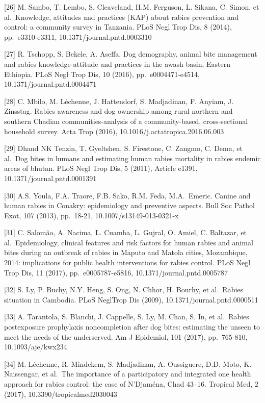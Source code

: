 \documentclass[
]{book}
\begin{document}
{[}26{]} M. Sambo, T. Lembo, S. Cleaveland, H.M. Ferguson, L. Sikana, C. Simon, et al.~Knowledge, attitudes and practices (KAP) about rabies prevention and control: a community survey in Tanzania. PLoS Negl Trop Dis, 8 (2014), pp.~e3310-e3311, 10.1371/journal.pntd.0003310

{[}27{]} R. Tschopp, S. Bekele, A. Aseffa. Dog demography, animal bite management and rabies knowledge-attitude and practices in the awash basin, Eastern Ethiopia. PLoS Negl Trop Dis, 10 (2016), pp.~e0004471-e4514, 10.1371/journal.pntd.0004471

{[}28{]} C. Mbilo, M. Léchenne, J. Hattendorf, S. Madjadinan, F. Anyiam, J. Zinsstag. Rabies awareness and dog ownership among rural northern and southern Chadian communities-analysis of a community-based, cross-sectional household survey. Acta Trop (2016), 10.1016/j.actatropica.2016.06.003

{[}29{]} Dhand NK Tenzin, T. Gyeltshen, S. Firestone, C. Zangmo, C. Dema, et al.~Dog bites in humans and estimating human rabies mortality in rabies endemic areas of bhutan. PLoS Negl Trop Dis, 5 (2011), Article e1391, 10.1371/journal.pntd.0001391

{[}30{]} A.S. Youla, F.A. Traore, F.B. Sako, R.M. Feda, M.A.~Emeric. Canine and human rabies in Conakry: epidemiology and preventive aspects. Bull Soc Pathol Exot, 107 (2013), pp.~18-21, 10.1007/s13149-013-0321-x

{[}31{]} C. Salomão, A. Nacima, L. Cuamba, L. Gujral, O. Amiel, C. Baltazar, et al.~Epidemiology, clinical features and risk factors for human rabies and animal bites during an outbreak of rabies in Maputo and Matola cities, Mozambique, 2014: implications for public health interventions for rabies control. PLoS Negl Trop Dis, 11 (2017), pp.~e0005787-e5816, 10.1371/journal.pntd.0005787

{[}32{]} S. Ly, P. Buchy, N.Y. Heng, S. Ong, N. Chhor, H. Bourhy, et al.~Rabies situation in Cambodia. PLoS NeglTrop Dis (2009), 10.1371/journal.pntd.0000511

{[}33{]} A. Tarantola, S. Blanchi, J. Cappelle, S. Ly, M. Chan, S. In, et al.~Rabies postexposure prophylaxis noncompletion after dog bites: estimating the unseen to meet the needs of the underserved. Am J Epidemiol, 101 (2017), pp.~765-810, 10.1093/aje/kwx234

{[}34{]} M. Léchenne, R. Mindekem, S. Madjadinan, A. Oussiguere, D.D. Moto, K. Naissengar, et al.~The importance of a participatory and integrated one health approach for rabies control: the case of N'Djaména, Chad 43--16. Tropical Med, 2 (2017), 10.3390/tropicalmed2030043
\end{document}
